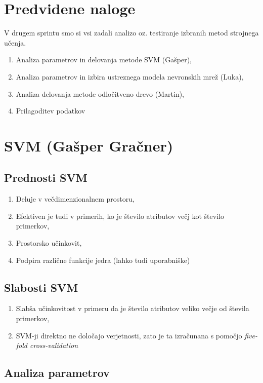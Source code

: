 \documentclass[a4paper,11pt]{article}
\begin{document}
\section{Predvidene naloge}
V drugem sprintu smo si vsi zadali analizo oz. testiranje izbranih metod strojnega učenja.
	\begin{enumerate}
		\item{Analiza parametrov in delovanja metode SVM (Gašper),}
		\item{Analiza parametrov in izbira ustreznega modela nevronskih mrež (Luka),}
		\item{Analiza delovanja metode odločitveno drevo (Martin),}
		\item{Prilagoditev podatkov}
	\end{enumerate}
	

\newpage
\section{ SVM (Gašper Gračner)}

\subsection{Prednosti SVM}
\begin{enumerate}
	\item{Deluje v večdimenzionalnem prostoru,}
	\item{Efektiven je tudi v primerih, ko je število atributov večj kot število primerkov,}
	\item{Prostorsko učinkovit,}
	\item{Podpira različne funkcije jedra (lahko tudi uporabniške)}
\end{enumerate}

\subsection{Slabosti SVM}
\begin{enumerate}
	\item{Slabša učinkovitost v primeru da je število atributov veliko večje od števila primerkov,}
	\item{SVM-ji direktno ne določajo verjetnosti, zato je ta izračunana s pomočjo \textit{five-fold cross-validation}}
\end{enumerate}

\subsection{Analiza parametrov}
\end{document}
